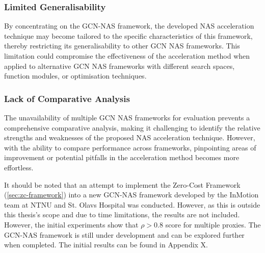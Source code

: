 \subsubsection{Limited Generalisability}
By concentrating on the GCN-NAS framework, the developed NAS acceleration technique may become tailored to the specific characteristics of this framework, thereby restricting its generalisability to other GCN NAS frameworks. This limitation could compromise the effectiveness of the acceleration method when applied to alternative GCN NAS frameworks with different search spaces, function modules, or optimisation techniques.

\subsubsection{Lack of Comparative Analysis}
The unavailability of multiple GCN NAS frameworks for evaluation prevents a comprehensive comparative analysis, making it challenging to identify the relative strengths and weaknesses of the proposed NAS acceleration technique. However, with the ability to compare performance across frameworks, pinpointing areas of improvement or potential pitfalls in the acceleration method becomes more effortless. 

It should be noted that an attempt to implement the Zero-Cost Framework (\cref{sec:zc-framework}) into a new GCN-NAS framework developed by the InMotion team at NTNU and St. Olavs Hospital was conducted. However, as this is outside this thesis's scope and due to time limitations, the results are not included. However, the initial experiments show that $ \rho >0.8$ score for multiple proxies. The GCN-NAS framework is still under development and can be explored further when completed. The initial results can be found in Appendix X. 

\begin{comment}
    
\kommentar{Usikker på om dette burde være her:}{The authors did attempt to implement the Zero-Cost Framework (\autoref{sec:zc-framework}) into the new GNN-NAS framework developed by the InMotion team at NTNU and St. Olavs Hospital. However, as this is outside the scope of this thesis, the results are not included. However, the initial metrics show a $>0.8$ score for multiple proxies. The GNN-NAS framework is still under development and must be explored further when completed.}
\end{comment}


